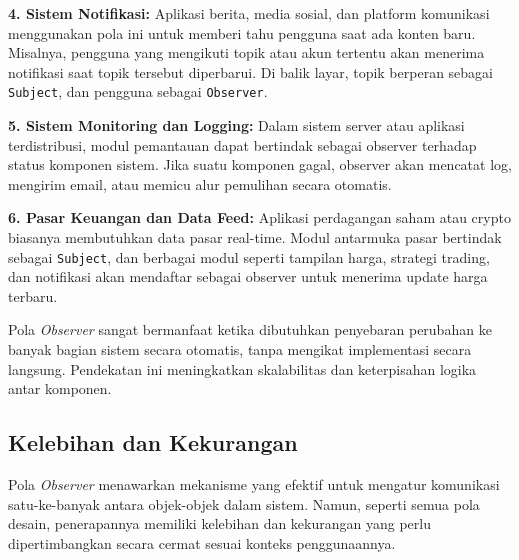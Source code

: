 \textbf{4. Sistem Notifikasi:}  
Aplikasi berita, media sosial, dan platform komunikasi menggunakan pola ini untuk memberi tahu pengguna saat ada konten baru. Misalnya, pengguna yang mengikuti topik atau akun tertentu akan menerima notifikasi saat topik tersebut diperbarui. Di balik layar, topik berperan sebagai \texttt{Subject}, dan pengguna sebagai \texttt{Observer}.

\textbf{5. Sistem Monitoring dan Logging:}  
Dalam sistem server atau aplikasi terdistribusi, modul pemantauan dapat bertindak sebagai observer terhadap status komponen sistem. Jika suatu komponen gagal, observer akan mencatat log, mengirim email, atau memicu alur pemulihan secara otomatis.

\textbf{6. Pasar Keuangan dan Data Feed:}  
Aplikasi perdagangan saham atau crypto biasanya membutuhkan data pasar real-time. Modul antarmuka pasar bertindak sebagai \texttt{Subject}, dan berbagai modul seperti tampilan harga, strategi trading, dan notifikasi akan mendaftar sebagai observer untuk menerima update harga terbaru.

Pola \textit{Observer} sangat bermanfaat ketika dibutuhkan penyebaran perubahan ke banyak bagian sistem secara otomatis, tanpa mengikat implementasi secara langsung. Pendekatan ini meningkatkan skalabilitas dan keterpisahan logika antar komponen.

\subsection{Kelebihan dan Kekurangan}

Pola \textit{Observer} menawarkan mekanisme yang efektif untuk mengatur komunikasi satu-ke-banyak antara objek-objek dalam sistem. Namun, seperti semua pola desain, penerapannya memiliki kelebihan dan kekurangan yang perlu dipertimbangkan secara cermat sesuai konteks penggunaannya.

